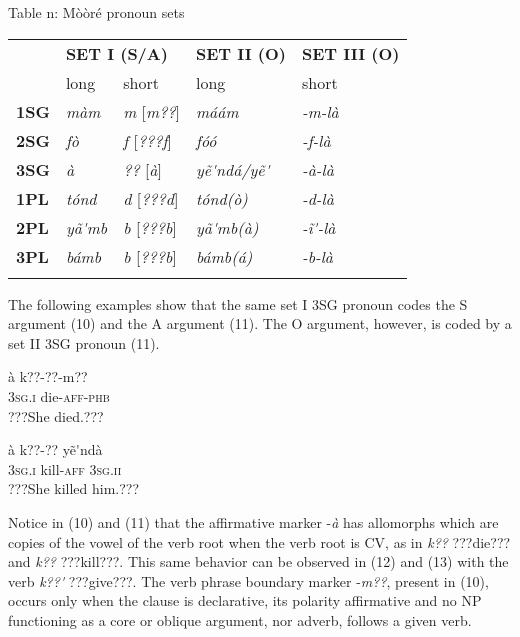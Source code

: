 \documentclass[output=paper]{langsci/langscibook}
\begin{document}
\begin{styleTabellenberschrift}
\label{bkm:Ref424142670}Table n: Mòòré pronoun sets
\end{styleTabellenberschrift}

\begin{tabular}{lllll}
\lsptoprule
\hhline{~----} & \multicolumn{2}{l}{ \textbf{SET I (S/A)}} & \textbf{SET II (O)} & \textbf{SET III (O)}\\
& long & short & long & short\\
\textbf{1SG} & \textit{màm} & \textit{m   }[\textit{m??}] & \textit{máám} & \textit{{}-m-là}\\
\textbf{2SG} & \textit{fò} & \textit{f     }[\textit{???f}] & \textit{fóó} & \textit{{}-f-là}\\
\textbf{3SG} & \textit{à} & \textit{??    }[\textit{à}] & \textit{yẽ\'{ }ndá/yẽ\'{ }} & \textit{{}-à-là}\\
\textbf{1PL} & \textit{tónd} & \textit{d}    [\textit{???d}] & \textit{tónd(ò)} & \textit{{}-d-là}\\
\textbf{2PL} & \textit{yã\'{ }mb} & \textit{b    }[\textit{???b}] & \textit{yã\'{ }mb(à)} & \textit{{}-\~{i}\'{ }-là}\\
\textbf{3PL} & \textit{bámb} & \textit{b    }[\textit{???b}] & \textit{bámb(á)} & \textit{{}-b-là}\\
\lspbottomrule
\end{tabular}
The following examples show that the same set I 3SG pronoun codes the S argument (10) and the A argument (11). The O argument, however, is coded by a set II 3SG pronoun (11).

\ea \gll 
\label{bkm:Ref424141576}à    k??-??{}-m??          
\\
%
\textsc{3sg.i    }die-\textsc{aff-phb}
\\\glt
???She died.???
\z

\ea \gll 
\label{bkm:Ref424141584}à    k??-??    yẽ\'{ }ndà
\\
%
\textsc{3sg.i}    kill-\textsc{aff  3sg.ii}
\\\glt
???She killed him.???
\z

Notice in (10) and (11) that the affirmative marker -\textit{à} has allomorphs which are copies of the vowel of the verb root when the verb root is CV, as in \textit{k??} ???die??? and \textit{k??} ???kill???. This same behavior can be observed in (12) and (13) with the verb \textit{k??\'{ }} ???give???. The verb phrase boundary marker -\textit{m??}, present in (10), occurs only when the clause is declarative, its polarity affirmative and no NP functioning as a core or oblique argument, nor adverb, follows a given verb.  
\end{document}
